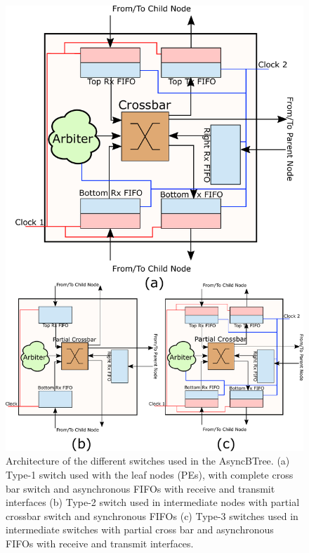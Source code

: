 \begin{figure}[t]
\centering
   \includegraphics[width=\columnwidth]{Figures/switch1_2.pdf}
   \caption{Architecture of the different switches used in the AsyncBTree. (a) Type-1 switch used with the leaf nodes (PEs), with complete cross bar switch and asynchronous 
   FIFOs with receive and transmit interfaces (b) Type-2 switch used in intermediate nodes with partial crossbar switch and synchronous FIFOs (c) Type-3 switches used in intermediate
   switches with partial cross bar and asynchronous FIFOs with receive and transmit interfaces.}
   \label{fig:switchArch}
\end{figure}

